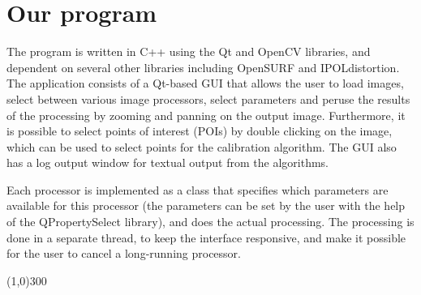 \section{Our program}
\label{sec:prog}
The program is written in C++ using the Qt and OpenCV libraries, and
dependent on several other libraries including OpenSURF and IPOLdistortion.
The application consists of a Qt-based GUI that allows the user to load
images, select between various image processors, select parameters and
peruse the results of the processing by zooming and panning on the
output image. Furthermore, it is possible to select points of interest
(POIs) by double clicking on the image, which can be used to select
points for the calibration algorithm. The GUI also has a log output
window for textual output from the algorithms.

Each processor is implemented as a class that specifies which
parameters are available for this processor (the parameters can be set
by the user with the help of the QPropertySelect library), and does
the actual processing. The processing is done in a separate thread, to
keep the interface responsive, and make it possible for the user to
cancel a long-running processor.






\begin{center}
\line(1,0){300}
\end{center}
